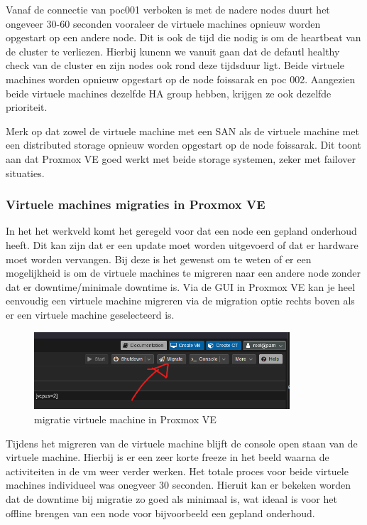 Vanaf de connectie van poc001 verboken is met de nadere nodes duurt het ongeveer 30-60 seconden vooraleer de virtuele machines opnieuw worden opgestart op een andere node. Dit is ook de tijd die nodig is om de heartbeat van de cluster te verliezen.
Hierbij kunenn we vanuit gaan dat de defautl healthy check van de cluster en zijn nodes ook rond deze tijdsduur ligt. Beide virtuele machines worden opnieuw opgestart op de node foissarak en poc 002. 
Aangezien beide virtuele machines dezelfde HA group hebben, krijgen ze ook dezelfde prioriteit.

Merk op dat zowel de virtuele machine met een SAN als de virtuele machine met een distributed storage opnieuw worden opgestart op de node foissarak. Dit toont aan dat Proxmox VE goed werkt met beide storage systemen, zeker met failover situaties.


\subsubsection{Virtuele machines migraties in Proxmox VE}
In het het werkveld komt het geregeld voor dat een node een gepland onderhoud heeft. Dit kan zijn dat er een update moet worden uitgevoerd of dat er hardware moet worden vervangen.
Bij deze is het gewenst om te weten of er een mogelijkheid is om de virtuele machines te migreren naar een andere node zonder dat er downtime/minimale downtime is.
Via de GUI in Proxmox VE kan je heel eenvoudig een virtuele machine migreren via de migration optie rechts boven als er een virtuele machine geselecteerd is.
\begin{figure}[H]
  \centering
  \includegraphics[width=0.85\textwidth]{../poc/vm-migratie-prox.png}
  \caption{migratie virtuele machine in Proxmox VE}
  \label{fig:migratie-vm}
\end{figure}
Tijdens het migreren van de virtuele machine blijft de console open staan van de virtuele machine. Hierbij is er een zeer korte freeze in het beeld waarna de activiteiten in de vm weer verder werken. Het totale proces voor beide virtuele machines individueel was onegveer 30 seconden.
Hieruit kan er bekeken worden dat de downtime bij migratie zo goed als minimaal is, wat ideaal is voor het offline brengen van een node voor bijvoorbeeld een gepland onderhoud.


